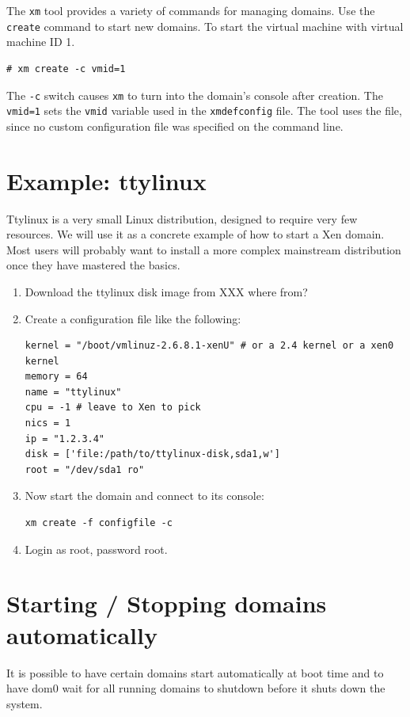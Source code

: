 \documentclass[11pt,twoside,final,openright]{xenstyle}
\begin{document}
The {\tt xm} tool provides a variety of commands for managing domains.
Use the {\tt create} command to start new domains.  To start the
virtual machine with virtual machine ID 1.

\begin{verbatim}
# xm create -c vmid=1
\end{verbatim}

The {\tt -c} switch causes {\tt xm} to turn into the domain's console
after creation.  The {\tt vmid=1} sets the {\tt vmid} variable used in
the {\tt xmdefconfig} file.  The tool uses the
 file, since no custom configuration file
was specified on the command line.

\section{Example: ttylinux}

Ttylinux is a very small Linux distribution, designed to
require very few resources.  We will use it as a concrete example of
how to start a Xen domain.  Most users will probably want to install a
more complex mainstream distribution once they have mastered the
basics.

\begin{enumerate}
\item Download the ttylinux disk image from XXX where from?
\item Create a configuration file like the following:
\begin{verbatim}
kernel = "/boot/vmlinuz-2.6.8.1-xenU" # or a 2.4 kernel or a xen0 kernel
memory = 64
name = "ttylinux"
cpu = -1 # leave to Xen to pick
nics = 1
ip = "1.2.3.4"
disk = ['file:/path/to/ttylinux-disk,sda1,w']
root = "/dev/sda1 ro"
\end{verbatim}
\item Now start the domain and connect to its console:
\begin{verbatim}
xm create -f configfile -c
\end{verbatim}
\item Login as root, password root.
\end{enumerate}

\section{Starting / Stopping domains automatically}

It is possible to have certain domains start automatically at boot
time and to have dom0 wait for all running domains to shutdown before
it shuts down the system.
\end{document}
